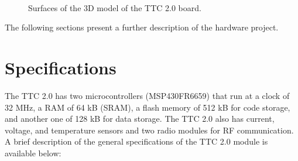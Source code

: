 \begin{figure}[!ht]
    \begin{center}
        ~
        \caption{Surfaces of the 3D model of the TTC 2.0 board.}
        \label{fig:ttc2-3d-surface}
    \end{center}
\end{figure}

The following sections present a further description of the hardware project.

\section{Specifications}

The TTC 2.0 has two microcontrollers (MSP430FR6659) that run at a clock of 32 MHz, a RAM of 64 kB (SRAM), a flash memory of 512 kB for code storage, and another one of 128 kB for data storage. The TTC 2.0 also has current, voltage, and temperature sensors and two radio modules for RF communication. A brief description of the general specifications of the TTC 2.0 module is available below:


